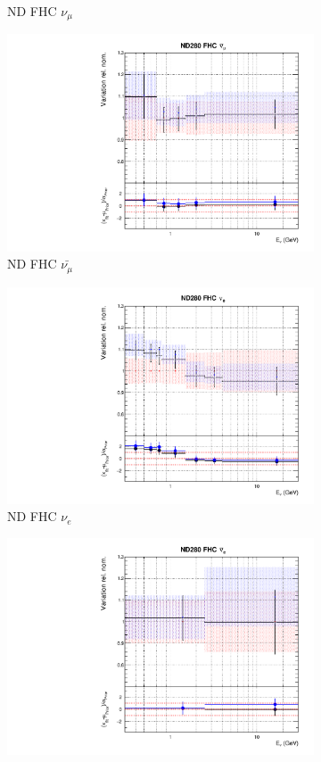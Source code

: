 \begin{figure}
\begin{subfigure}{0.45\textwidth}
  \caption{ND FHC $\nu_{\mu}$}
\end{subfigure}
\begin{subfigure}{0.45\textwidth}
  \centering
  \includegraphics[width=0.75\linewidth]{figs/comp5q2vs8q2flux1}
  \caption{ND FHC $\bar{\nu_{\mu}}$}
\end{subfigure}
\begin{subfigure}{0.45\textwidth}
  \centering
  \includegraphics[width=0.75\linewidth]{figs/comp5q2vs8q2flux2}
  \caption{ND FHC $\nu_{e}$}
\end{subfigure}
\begin{subfigure}{0.45\textwidth}
  \centering
  \includegraphics[width=0.75\linewidth]{figs/comp5q2vs8q2flux3}

\end{subfigure}
\end{figure}
